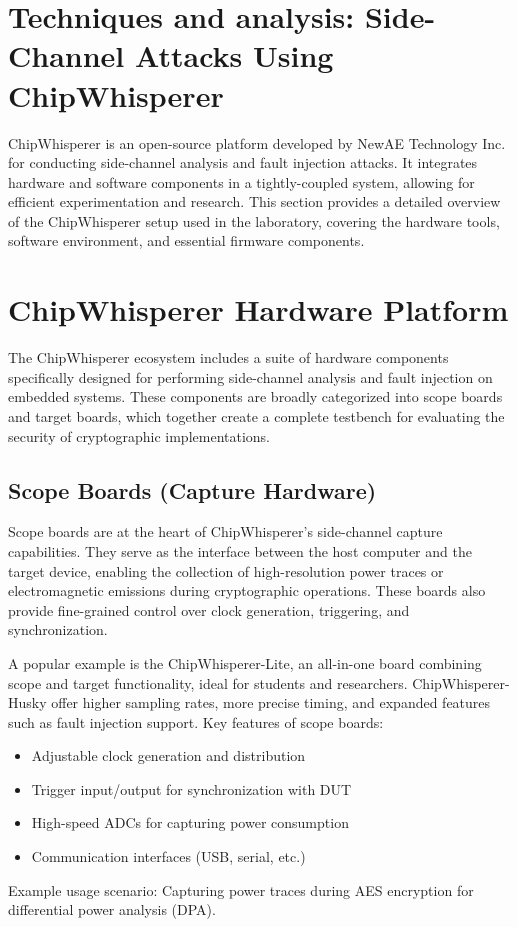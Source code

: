 \section{Techniques and analysis: Side-Channel Attacks Using ChipWhisperer }
ChipWhisperer is an open-source platform developed by NewAE Technology Inc. for conducting side-channel analysis and fault injection attacks. It integrates hardware and software components in a tightly-coupled system, allowing for efficient experimentation and research. This section provides a detailed overview of the ChipWhisperer setup used in the laboratory, covering the hardware tools, software environment, and essential firmware components.
\section{ChipWhisperer Hardware Platform}
The ChipWhisperer ecosystem includes a suite of hardware components specifically designed for performing side-channel analysis and fault injection on embedded systems. These components are broadly categorized into scope boards and target boards, which together create a complete testbench for evaluating the security of cryptographic implementations.
\subsection{Scope Boards (Capture Hardware)}
Scope boards are at the heart of ChipWhisperer's side-channel capture capabilities. They serve as the interface between the host computer and the target device, enabling the collection of high-resolution power traces or electromagnetic emissions during cryptographic operations. These boards also provide fine-grained control over clock generation, triggering, and synchronization.

A popular example is the ChipWhisperer-Lite, an all-in-one board combining scope and target functionality, ideal for students and researchers. ChipWhisperer-Husky offer higher sampling rates, more precise timing, and expanded features such as fault injection support.
Key features of scope boards:
\begin{itemize}
    \item Adjustable clock generation and distribution
    \item Trigger input/output for synchronization with DUT
    \item High-speed ADCs for capturing power consumption
    \item Communication interfaces (USB, serial, etc.)
\end{itemize}
Example usage scenario: Capturing power traces during AES encryption for differential power analysis (DPA).

